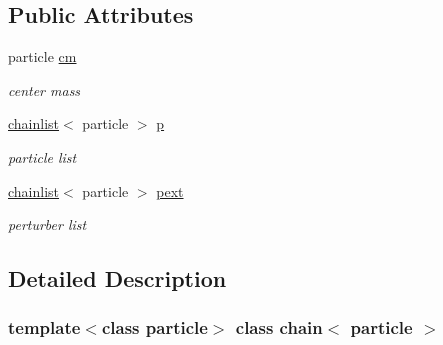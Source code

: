 \subsection*{Public Attributes}
\begin{DoxyCompactItemize}
\item 
particle \hyperlink{classchain_a84dfcd9f0112836152bc6843e8f74505}{cm}
\begin{DoxyCompactList}\small\item\em center mass \end{DoxyCompactList}\item 
\hyperlink{classchainlist}{chainlist}$<$ particle $>$ \hyperlink{classchain_a1962dd942432d4f43b5f26e292fa4836}{p}
\begin{DoxyCompactList}\small\item\em particle list \end{DoxyCompactList}\item 
\hyperlink{classchainlist}{chainlist}$<$ particle $>$ \hyperlink{classchain_ad26d11d20934a500df042ecf333a3f72}{pext}
\begin{DoxyCompactList}\small\item\em perturber list \end{DoxyCompactList}\end{DoxyCompactItemize}


\subsection{Detailed Description}
\subsubsection*{template$<$class particle$>$\newline
class chain$<$ particle $>$}

